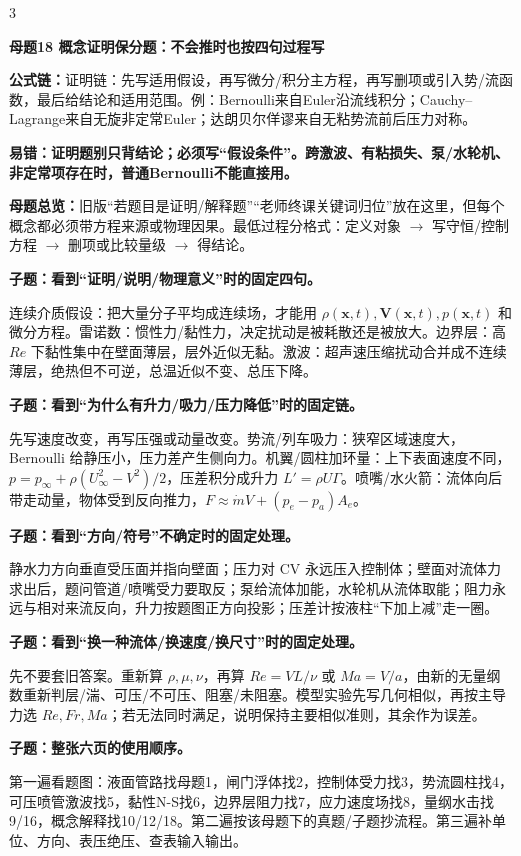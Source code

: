 \documentclass[a4paper]{article}
\newcommand{\mt}[1]{\vspace{0.22pt}\colorbox{M}{\parbox{\dimexpr\linewidth-2\fboxsep}{\color{white}\bfseries #1}}\par}
\newcommand{\qt}[1]{\vspace{0.10pt}\colorbox{Q}{\parbox{\dimexpr\linewidth-2\fboxsep}{\color{white}\bfseries #1}}\par}
\newcommand{\ans}[1]{\colorbox{G}{\parbox{\dimexpr\linewidth-2\fboxsep}{#1}}\par}
\newcommand{\warn}[1]{\colorbox{Y}{\parbox{\dimexpr\linewidth-2\fboxsep}{\color{E}\bfseries #1}}\par}
\newcommand{\form}[1]{{\color{M}\bfseries 公式链：}#1\par}
\newcommand{\mview}[1]{\ans{\textbf{母题总览：}#1}}
\begin{document}
\begin{multicols}{3}
\mt{母题18 概念证明保分题：不会推时也按四句过程写}
\form{证明链：先写适用假设，再写微分/积分主方程，再写删项或引入势/流函数，最后给结论和适用范围。例：Bernoulli来自Euler沿流线积分；Cauchy--Lagrange来自无旋非定常Euler；达朗贝尔佯谬来自无粘势流前后压力对称。}
\warn{易错：证明题别只背结论；必须写“假设条件”。跨激波、有粘损失、泵/水轮机、非定常项存在时，普通Bernoulli不能直接用。}
\mview{旧版“若题目是证明/解释题”“老师终课关键词归位”放在这里，但每个概念都必须带方程来源或物理因果。最低过程分格式：定义对象 $\to$ 写守恒/控制方程 $\to$ 删项或比较量级 $\to$ 得结论。}
\qt{子题：看到“证明/说明/物理意义”时的固定四句。}
\ans{连续介质假设：把大量分子平均成连续场，才能用 $\rho(\bm x,t),\bm V(\bm x,t),p(\bm x,t)$ 和微分方程。雷诺数：惯性力/黏性力，决定扰动是被耗散还是被放大。边界层：高 $Re$ 下黏性集中在壁面薄层，层外近似无黏。激波：超声速压缩扰动合并成不连续薄层，绝热但不可逆，总温近似不变、总压下降。}
\qt{子题：看到“为什么有升力/吸力/压力降低”时的固定链。}
\ans{先写速度改变，再写压强或动量改变。势流/列车吸力：狭窄区域速度大，Bernoulli 给静压小，压力差产生侧向力。机翼/圆柱加环量：上下表面速度不同，$p=p_\infty+\rho(U_\infty^2-V^2)/2$，压差积分成升力 $L'=\rho U\Gamma$。喷嘴/水火箭：流体向后带走动量，物体受到反向推力，$F\approx\dot mV+(p_e-p_a)A_e$。}
\qt{子题：看到“方向/符号”不确定时的固定处理。}
\ans{静水力方向垂直受压面并指向壁面；压力对 CV 永远压入控制体；壁面对流体力求出后，题问管道/喷嘴受力要取反；泵给流体加能，水轮机从流体取能；阻力永远与相对来流反向，升力按题图正方向投影；压差计按液柱“下加上减”走一圈。}
\qt{子题：看到“换一种流体/换速度/换尺寸”时的固定处理。}
\ans{先不要套旧答案。重新算 $\rho,\mu,\nu$，再算 $Re=VL/\nu$ 或 $Ma=V/a$，由新的无量纲数重新判层/湍、可压/不可压、阻塞/未阻塞。模型实验先写几何相似，再按主导力选 $Re,Fr,Ma$；若无法同时满足，说明保持主要相似准则，其余作为误差。}
\qt{子题：整张六页的使用顺序。}
\ans{第一遍看题图：液面管路找母题1，闸门浮体找2，控制体受力找3，势流圆柱找4，可压喷管激波找5，黏性N-S找6，边界层阻力找7，应力速度场找8，量纲水击找9/16，概念解释找10/12/18。第二遍按该母题下的真题/子题抄流程。第三遍补单位、方向、表压绝压、查表输入输出。}


\end{multicols}
\end{document}

